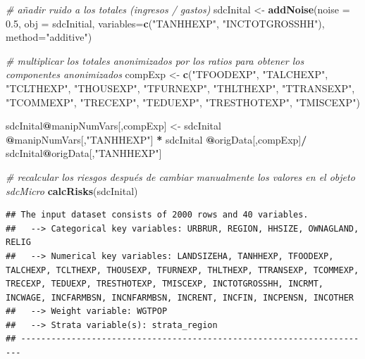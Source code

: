\documentclass[]{book}
\newenvironment{Shaded}{\begin{snugshade}}{\end{snugshade}}
\newcommand{\CommentTok}[1]{\textcolor[rgb]{0.56,0.35,0.01}{\textit{#1}}}
\newcommand{\DataTypeTok}[1]{\textcolor[rgb]{0.13,0.29,0.53}{#1}}
\newcommand{\FloatTok}[1]{\textcolor[rgb]{0.00,0.00,0.81}{#1}}
\newcommand{\KeywordTok}[1]{\textcolor[rgb]{0.13,0.29,0.53}{\textbf{#1}}}
\newcommand{\NormalTok}[1]{#1}
\newcommand{\OperatorTok}[1]{\textcolor[rgb]{0.81,0.36,0.00}{\textbf{#1}}}
\newcommand{\StringTok}[1]{\textcolor[rgb]{0.31,0.60,0.02}{#1}}
\theoremstyle{definition}
\theoremstyle{definition}
\theoremstyle{definition}
\theoremstyle{definition}
\theoremstyle{remark}
\begin{document}
\begin{Shaded}
\begin{Highlighting}[]
\CommentTok{# añadir ruido a los totales (ingresos / gastos)}
\NormalTok{sdcInital <-}\StringTok{ }\KeywordTok{addNoise}\NormalTok{(}\DataTypeTok{noise =} \FloatTok{0.5}\NormalTok{, }\DataTypeTok{obj =}\NormalTok{ sdcInitial, }\DataTypeTok{variables=}\KeywordTok{c}\NormalTok{(}\StringTok{"TANHHEXP"}\NormalTok{, }\StringTok{"INCTOTGROSSHH"}\NormalTok{), }\DataTypeTok{method=}\StringTok{"additive"}\NormalTok{) }

\CommentTok{# multiplicar los totales anonimizados por los ratios para obtener los componentes anonimizados}
\NormalTok{compExp <-}\StringTok{  }\KeywordTok{c}\NormalTok{(}\StringTok{"TFOODEXP"}\NormalTok{, }\StringTok{"TALCHEXP"}\NormalTok{, }\StringTok{"TCLTHEXP"}\NormalTok{, }\StringTok{"THOUSEXP"}\NormalTok{, }
              \StringTok{"TFURNEXP"}\NormalTok{, }\StringTok{"THLTHEXP"}\NormalTok{, }\StringTok{"TTRANSEXP"}\NormalTok{, }\StringTok{"TCOMMEXP"}\NormalTok{, }
              \StringTok{"TRECEXP"}\NormalTok{, }\StringTok{"TEDUEXP"}\NormalTok{, }\StringTok{"TRESTHOTEXP"}\NormalTok{, }\StringTok{"TMISCEXP"}\NormalTok{)}

\NormalTok{sdcInital}\OperatorTok{@}\NormalTok{manipNumVars[,compExp] <-}\StringTok{ }\NormalTok{sdcInital }\OperatorTok{@}\NormalTok{manipNumVars[,}\StringTok{"TANHHEXP"}\NormalTok{] }\OperatorTok{*}\StringTok{ }
\StringTok{                                      }\NormalTok{sdcInital }\OperatorTok{@}\NormalTok{origData[,compExp]}\OperatorTok{/}\StringTok{ }\NormalTok{sdcInital}\OperatorTok{@}\NormalTok{origData[,}\StringTok{"TANHHEXP"}\NormalTok{]}

\CommentTok{# recalcular los riesgos después de cambiar manualmente los valores en el objeto sdcMicro}
\KeywordTok{calcRisks}\NormalTok{(sdcInital)}
\end{Highlighting}
\end{Shaded}

\begin{verbatim}
## The input dataset consists of 2000 rows and 40 variables.
##   --> Categorical key variables: URBRUR, REGION, HHSIZE, OWNAGLAND, RELIG
##   --> Numerical key variables: LANDSIZEHA, TANHHEXP, TFOODEXP, TALCHEXP, TCLTHEXP, THOUSEXP, TFURNEXP, THLTHEXP, TTRANSEXP, TCOMMEXP, TRECEXP, TEDUEXP, TRESTHOTEXP, TMISCEXP, INCTOTGROSSHH, INCRMT, INCWAGE, INCFARMBSN, INCNFARMBSN, INCRENT, INCFIN, INCPENSN, INCOTHER
##   --> Weight variable: WGTPOP
##   --> Strata variable(s): strata_region
## ----------------------------------------------------------------------
\end{verbatim}
\end{document}
